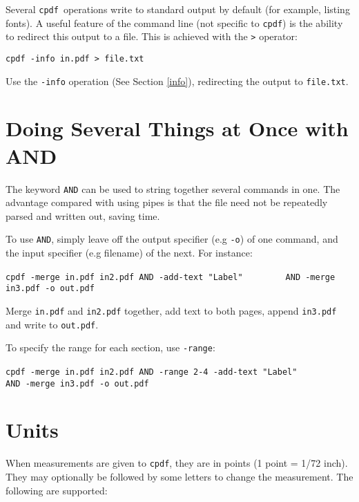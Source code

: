\documentclass{book}
\newcommand{\cpdf}{\texttt{cpdf}}
\begin{document}
Several \cpdf\ operations write to standard output by default (for
example, listing fonts). A useful feature of the command line (not specific to
\cpdf) is the ability to redirect this output to a file. This is
achieved with the \texttt{>} operator:

\begin{framed}
  \small\verb!cpdf -info in.pdf > file.txt!

  \vspace{2.5mm}
  \noindent Use the \texttt{-info} operation (See Section \ref{info}), redirecting the
output to \texttt{file.txt}.
\end{framed}

\section{Doing Several Things at Once with AND}

The keyword \texttt{AND} can be used to string together several commands in
one. The advantage compared with using pipes is that the file need not be
repeatedly parsed and written out, saving time.

To use \texttt{AND}, simply leave off the output specifier (e.g \texttt{-o}) of
one command, and the input specifier (e.g filename) of the next. For instance:

\begin{framed}
  \small\verb!cpdf -merge in.pdf in2.pdf AND -add-text "Label"!
  \noindent\small\verb!        AND -merge in3.pdf -o out.pdf!

  \vspace{2.5mm}
  \noindent Merge \texttt{in.pdf} and \texttt{in2.pdf} together, add text to both pages, append \texttt{in3.pdf} and write to \texttt{out.pdf}.
\end{framed}

\noindent To specify the range for each section, use \texttt{-range}:

\begin{framed}
  \small\verb!cpdf -merge in.pdf in2.pdf AND -range 2-4 -add-text "Label"!
  \noindent\small\verb!        AND -merge in3.pdf -o out.pdf!

\end{framed}

\section{Units}
When measurements are given to \cpdf, they are in points (1 point = 1/72 inch). They may optionally
be followed by some letters to change the measurement. The following are
supported:
\end{document}

